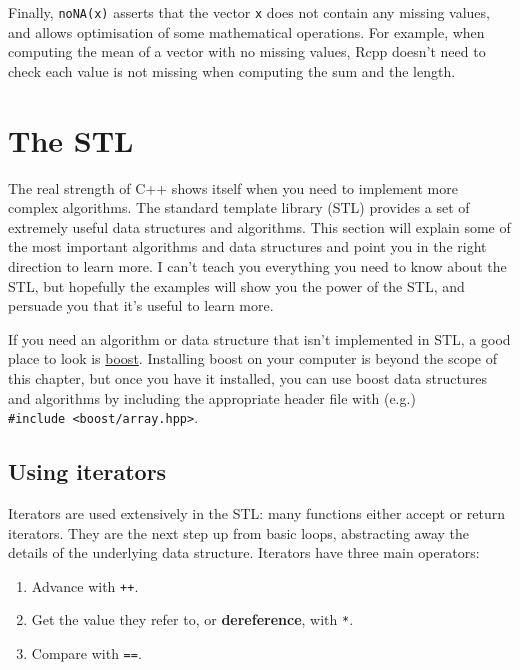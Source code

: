 Finally, \texttt{noNA(x)} asserts that the vector \texttt{x} does not
contain any missing values, and allows optimisation of some mathematical
operations. For example, when computing the mean of a vector with no
missing values, Rcpp doesn't need to check each value is not missing
when computing the sum and the length.

\hypertarget{stl}{%
\section{The STL}\label{stl}}

The real strength of C++ shows itself when you need to implement more
complex algorithms. The standard template library (STL) provides a set
of extremely useful data structures and algorithms. This section will
explain some of the most important algorithms and data structures and
point you in the right direction to learn more. I can't teach you
everything you need to know about the STL, but hopefully the examples
will show you the power of the STL, and persuade you that it's useful to
learn more. 

If you need an algorithm or data structure that isn't implemented in
STL, a good place to look is \href{http://www.boost.org/doc/}{boost}.
Installing boost on your computer is beyond the scope of this chapter,
but once you have it installed, you can use boost data structures and
algorithms by including the appropriate header file with (e.g.)
\texttt{\#include\ \textless{}boost/array.hpp\textgreater{}}.

\hypertarget{using-iterators}{%
\subsection{Using iterators}\label{using-iterators}}

Iterators are used extensively in the STL: many functions either accept
or return iterators. They are the next step up from basic loops,
abstracting away the details of the underlying data structure. Iterators
have three main operators: 

\begin{enumerate}
\def\labelenumi{\arabic{enumi}.}
\tightlist
\item
  Advance with \texttt{++}.
\item
  Get the value they refer to, or \textbf{dereference}, with \texttt{*}.
\item
  Compare with \texttt{==}.
\end{enumerate}

